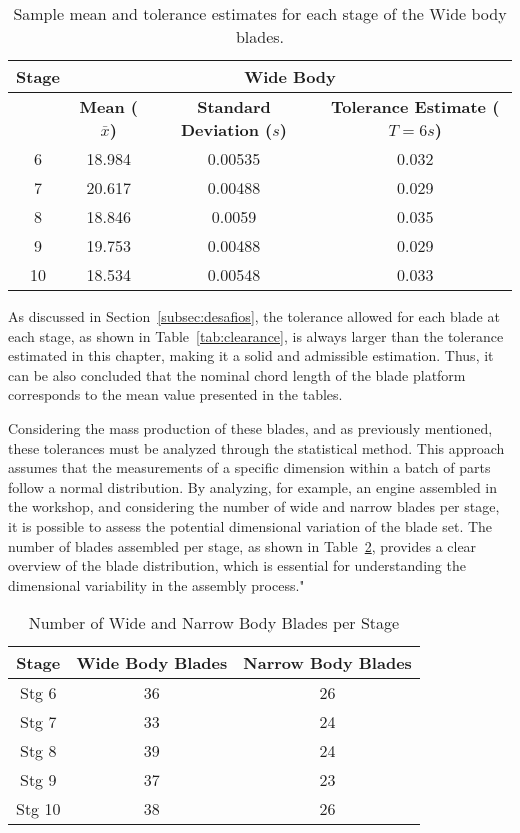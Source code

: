 \begin{table}[H]
    \centering
    \caption{Sample mean and tolerance estimates for each stage of the Wide body blades.}
    \label{tab:mean_tolerance_wide}
    \begin{tabular}{cccc}
        \hline
        \textbf{Stage} & \multicolumn{3}{c|}{\textbf{Wide Body}} \\
        \hline
        & \textbf{Mean (\( \bar{x} \))} & \textbf{Standard Deviation (\( s \))} & \textbf{Tolerance Estimate (\( T = 6s \))} \\
        \hline
        6  & 18.984 & 0.00535 & 0.032 \\
        7  & 20.617 & 0.00488 & 0.029 \\
        8  & 18.846 & 0.0059  & 0.035 \\
        9  & 19.753 & 0.00488  & 0.029 \\
        10 & 18.534 & 0.00548  & 0.033 \\
        \hline
    \end{tabular}
\end{table}

As discussed in Section~\ref{subsec:desafios}, the tolerance allowed for each blade at each stage, as shown in Table~\ref{tab:clearance}, is always larger than the tolerance estimated in this chapter, making it a solid and admissible estimation.
Thus, it can be also concluded that the nominal chord length of the blade platform corresponds to the mean value presented in the tables.

Considering the mass production of these blades, and as previously mentioned, these tolerances must be analyzed through the statistical method. This approach assumes that the measurements of a specific dimension within a batch of parts follow a normal distribution. By analyzing, for example, an engine assembled in the workshop, and considering the number of wide and narrow blades per stage, it is possible to assess the potential dimensional variation of the blade set. The number of blades assembled per stage, as shown in Table~\ref{tab:number_of_blades}, provides a clear overview of the blade distribution, which is essential for understanding the dimensional variability in the assembly process."

\begin{table}[H]
    \centering
    \caption{Number of Wide and Narrow Body Blades per Stage}
    \label{tab:number_of_blades}
    \begin{tabular}{ccc}
        \hline
        \textbf{Stage} & \textbf{Wide Body Blades} & \textbf{Narrow Body Blades} \\
        \hline
        Stg 6 & 36 & 26 \\
        Stg 7 & 33 & 24 \\
        Stg 8 & 39 & 24 \\
        Stg 9 & 37 & 23 \\
        Stg 10 & 38 & 26 \\
        \hline
    \end{tabular}
\end{table}

